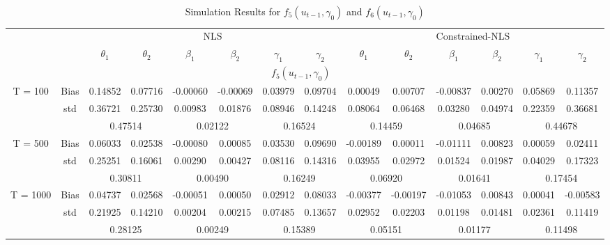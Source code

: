 \documentclass[a4paper,12pt,times,numbered,print,index]{report}
\numberwithin{equation}{section}
\begin{document}
\begin{table}[htbp]
  \centering
  \caption{Simulation Results for $f_5 (u_{t-1}, \gamma_0)$ and $f_6 (u_{t-1}, \gamma_0)$}
    \begin{adjustbox}{max width=\textwidth}
    \begin{tabular}{cccccccccccccc}
    \toprule
          &       & \multicolumn{6}{c}{NLS}                       & \multicolumn{6}{c}{Constrained-NLS} \\
          &       & $\theta_1$ & $\theta_2$ & $\beta_1$ & $\beta_2$ & $\gamma_1$ & $\gamma_2$ & $\theta_1$ & $\theta_2$ & $\beta_1$ & $\beta_2$ & $\gamma_1$ & $\gamma_2$ \\
    \midrule
    &       & \multicolumn{10}{c}{$f_5 (u_{t-1}, \gamma_0)$}                \\
    \midrule
    \multirow{3}[1]{*}{T = 100} & Bias  & 0.14852 & 0.07716 & -0.00060 & -0.00069 & 0.03979 & 0.09704 & 0.00049 & 0.00707 & -0.00837 & 0.00270 & 0.05869 & 0.11357 \\
          & std   & 0.36721 & 0.25730 & 0.00983 & 0.01876 & 0.08946 & 0.14248 & 0.08064 & 0.06468 & 0.03280 & 0.04974 & 0.22359 & 0.36681 \\
          &       & \multicolumn{2}{c}{0.47514} & \multicolumn{2}{c}{0.02122} & \multicolumn{2}{c}{0.16524} & \multicolumn{2}{c}{0.14459} & \multicolumn{2}{c}{0.04685} & \multicolumn{2}{c}{0.44678} \\
    \multirow{3}[0]{*}{T = 500} & Bias  & 0.06033 & 0.02538 & -0.00080 & 0.00085 & 0.03530 & 0.09690 & -0.00189 & 0.00011 & -0.01111 & 0.00823 & 0.00059 & 0.02411 \\
          & std   & 0.25251 & 0.16061 & 0.00290 & 0.00427 & 0.08116 & 0.14316 & 0.03955 & 0.02972 & 0.01524 & 0.01987 & 0.04029 & 0.17323 \\
          &       & \multicolumn{2}{c}{0.30811} & \multicolumn{2}{c}{0.00490} & \multicolumn{2}{c}{0.16249} & \multicolumn{2}{c}{0.06920} & \multicolumn{2}{c}{0.01641} & \multicolumn{2}{c}{0.17454} \\
    \multirow{3}[1]{*}{T = 1000} & Bias  & 0.04737 & 0.02568 & -0.00051 & 0.00050 & 0.02912 & 0.08033 & -0.00377 & -0.00197 & -0.01053 & 0.00843 & 0.00041 & -0.00583 \\
          & std   & 0.21925 & 0.14210 & 0.00204 & 0.00215 & 0.07485 & 0.13657 & 0.02952 & 0.02203 & 0.01198 & 0.01481 & 0.02361 & 0.11419 \\
          &       & \multicolumn{2}{c}{0.28125} & \multicolumn{2}{c}{0.00249} & \multicolumn{2}{c}{0.15389} & \multicolumn{2}{c}{0.05151} & \multicolumn{2}{c}{0.01177} & \multicolumn{2}{c}{0.11498} \\

\end{tabular}
\end{adjustbox}
\end{table}
\end{document}
